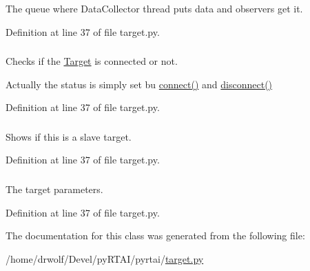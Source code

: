 \-The queue where \-Data\-Collector thread puts data and observers get it. 



\-Definition at line 37 of file target.\-py.

\hypertarget{classpyrtai_1_1target_1_1_target_a615b77c2475db26f9055078ab7f15f75}{
\subsubsection[{is\-\_\-connected}]{}}
\label{classpyrtai_1_1target_1_1_target_a615b77c2475db26f9055078ab7f15f75}


\-Checks if the \hyperlink{classpyrtai_1_1target_1_1_target}{\-Target} is connected or not. 

\-Actually the status is simply set bu \hyperlink{classpyrtai_1_1target_1_1_target_a8f84994a13eda611de5dc4dc357ba060}{connect()} and \hyperlink{classpyrtai_1_1target_1_1_target_a6b88fd3e02bd52f9d9596aecaa15414d}{disconnect()} 

\-Definition at line 37 of file target.\-py.

\hypertarget{classpyrtai_1_1target_1_1_target_a38d056a202885bac1459328108d600fa}{
\subsubsection[{is\-\_\-slave}]{}}
\label{classpyrtai_1_1target_1_1_target_a38d056a202885bac1459328108d600fa}


\-Shows if this is a slave target. 



\-Definition at line 37 of file target.\-py.

\hypertarget{classpyrtai_1_1target_1_1_target_aae04036f71a3a512b5461bf97692e7e9}{
\subsubsection[{parameters}]{}}
\label{classpyrtai_1_1target_1_1_target_aae04036f71a3a512b5461bf97692e7e9}


\-The target parameters. 



\-Definition at line 37 of file target.\-py.



\-The documentation for this class was generated from the following file\-:\begin{DoxyCompactItemize}
\item 
/home/drwolf/\-Devel/py\-R\-T\-A\-I/pyrtai/\hyperlink{target_8py}{target.\-py}\end{DoxyCompactItemize}
